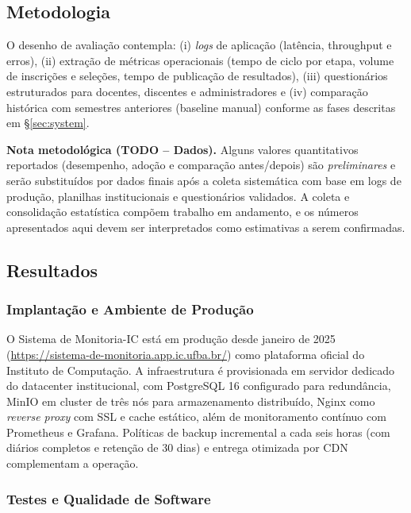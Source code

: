 \documentclass[portuguese]{sbc2025}%
\begin{document}
\subsection{Metodologia}

O desenho de avaliação contempla: (i) \textit{logs} de aplicação (latência, throughput e erros), (ii) extração de métricas operacionais (tempo de ciclo por etapa, volume de inscrições e seleções, tempo de publicação de resultados), (iii) questionários estruturados para docentes, discentes e administradores e (iv) comparação histórica com semestres anteriores (baseline manual) conforme as fases descritas em \S\ref{sec:system}.

\medskip
\noindent\textbf{Nota metodológica (TODO – Dados).} Alguns valores quantitativos reportados (desempenho, adoção e comparação antes/depois) são \textit{preliminares} e serão substituídos por dados finais após a coleta sistemática com base em logs de produção, planilhas institucionais e questionários validados. A coleta e consolidação estatística compõem trabalho em andamento, e os números apresentados aqui devem ser interpretados como estimativas a serem confirmadas.

\subsection{Resultados}

\subsubsection{Implantação e Ambiente de Produção}

O Sistema de Monitoria-IC está em produção desde janeiro de 2025 (\url{https://sistema-de-monitoria.app.ic.ufba.br/}) como plataforma oficial do Instituto de Computação. A infraestrutura é provisionada em servidor dedicado do datacenter institucional, com PostgreSQL 16 configurado para redundância, MinIO em cluster de três nós para armazenamento distribuído, Nginx como \textit{reverse proxy} com SSL e cache estático, além de monitoramento contínuo com Prometheus e Grafana. Políticas de backup incremental a cada seis horas (com diários completos e retenção de 30 dias) e entrega otimizada por CDN complementam a operação.

\subsubsection{Testes e Qualidade de Software}
\end{document}
